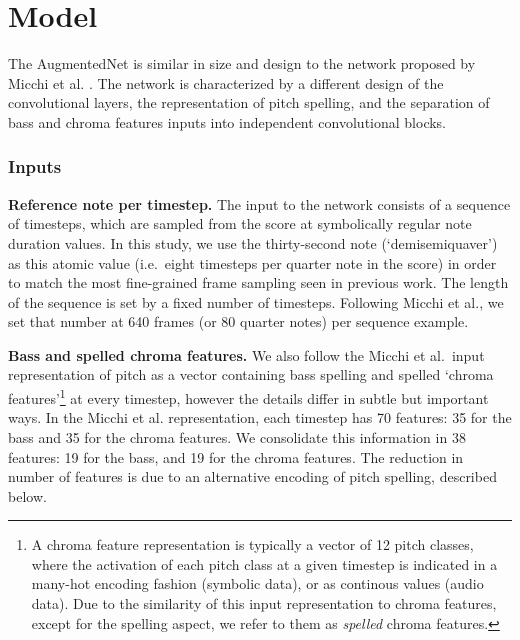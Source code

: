\chapter{Model}
\label{chap:chap5}


The AugmentedNet is similar in size and design to the network proposed by Micchi et al. \cite{micchi_not_2020}. The network is characterized by a different design of the convolutional layers, the representation of pitch spelling, and the separation of bass and chroma features inputs into independent convolutional blocks.

\subsection{Inputs}

\textbf{Reference note per timestep.}
The input to the network consists of a sequence of timesteps, which are sampled from the score at symbolically regular note duration values.
In this study, we use the thirty-second note (`demisemiquaver') as this atomic value (i.e.~eight timesteps per quarter note in the score) in order to match the most fine-grained frame sampling seen in previous work. The length of the sequence is set by a fixed number of timesteps. Following Micchi et al., we set that number at 640 frames (or 80 quarter notes) per sequence example.

\textbf{Bass and spelled chroma features.}
We also follow the Micchi et al.~input representation of pitch as a vector containing bass spelling and spelled `chroma features'\footnote{A chroma feature representation is typically a vector of 12 pitch classes, where the activation of each pitch class at a given timestep is indicated in a many-hot encoding fashion (symbolic data), or as continous values (audio data). 
Due to the similarity of this input representation to chroma features, except for the spelling aspect, we refer to them as \emph{spelled} chroma features.} at every timestep, however the details differ in subtle but important ways. 
In the Micchi et al. representation, each timestep has 70 features: 35 for the bass and 35 for the chroma features. 
We consolidate this information in 38 features: 19 for the bass, and 19 for the chroma features. The reduction in number of features is due to an alternative encoding of pitch spelling, described below.

